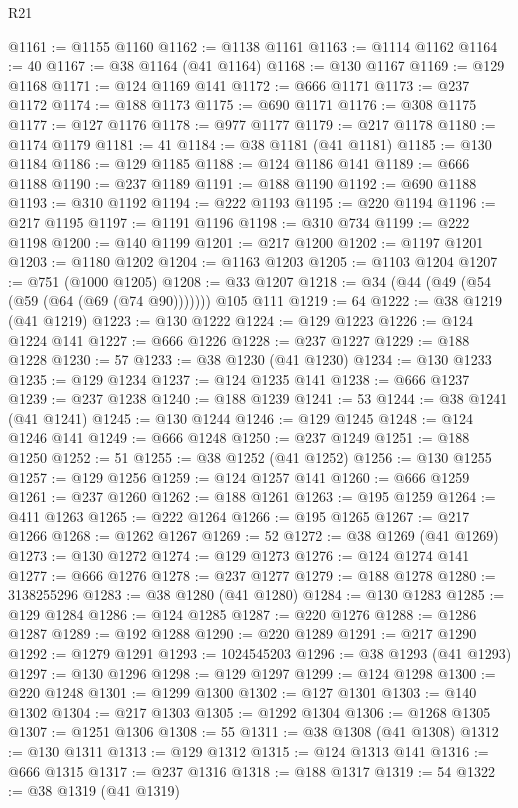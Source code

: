 \begin{lexlean}{R21}
\begin{coremodule}
@1161 := @1155 @1160
@1162 := @1138 @1161
@1163 := @1114 @1162
@1164 := 40
@1167 := @38 @1164 (@41 @1164)
@1168 := @130 @1167
@1169 := @129 @1168
@1171 := @124 @1169 @141
@1172 := @666 @1171
@1173 := @237 @1172
@1174 := @188 @1173
@1175 := @690 @1171
@1176 := @308 @1175
@1177 := @127 @1176
@1178 := @977 @1177
@1179 := @217 @1178
@1180 := @1174 @1179
@1181 := 41
@1184 := @38 @1181 (@41 @1181)
@1185 := @130 @1184
@1186 := @129 @1185
@1188 := @124 @1186 @141
@1189 := @666 @1188
@1190 := @237 @1189
@1191 := @188 @1190
@1192 := @690 @1188
@1193 := @310 @1192
@1194 := @222 @1193
@1195 := @220 @1194
@1196 := @217 @1195
@1197 := @1191 @1196
@1198 := @310 @734
@1199 := @222 @1198
@1200 := @140 @1199
@1201 := @217 @1200
@1202 := @1197 @1201
@1203 := @1180 @1202
@1204 := @1163 @1203
@1205 := @1103 @1204
@1207 := @751 (@1000 @1205)
@1208 := @33 @1207
@1218 := @34 (@44 (@49 (@54 (@59 (@64 (@69 (@74 @90))))))) @105 @111
@1219 := 64
@1222 := @38 @1219 (@41 @1219)
@1223 := @130 @1222
@1224 := @129 @1223
@1226 := @124 @1224 @141
@1227 := @666 @1226
@1228 := @237 @1227
@1229 := @188 @1228
@1230 := 57
@1233 := @38 @1230 (@41 @1230)
@1234 := @130 @1233
@1235 := @129 @1234
@1237 := @124 @1235 @141
@1238 := @666 @1237
@1239 := @237 @1238
@1240 := @188 @1239
@1241 := 53
@1244 := @38 @1241 (@41 @1241)
@1245 := @130 @1244
@1246 := @129 @1245
@1248 := @124 @1246 @141
@1249 := @666 @1248
@1250 := @237 @1249
@1251 := @188 @1250
@1252 := 51
@1255 := @38 @1252 (@41 @1252)
@1256 := @130 @1255
@1257 := @129 @1256
@1259 := @124 @1257 @141
@1260 := @666 @1259
@1261 := @237 @1260
@1262 := @188 @1261
@1263 := @195 @1259
@1264 := @411 @1263
@1265 := @222 @1264
@1266 := @195 @1265
@1267 := @217 @1266
@1268 := @1262 @1267
@1269 := 52
@1272 := @38 @1269 (@41 @1269)
@1273 := @130 @1272
@1274 := @129 @1273
@1276 := @124 @1274 @141
@1277 := @666 @1276
@1278 := @237 @1277
@1279 := @188 @1278
@1280 := 3138255296
@1283 := @38 @1280 (@41 @1280)
@1284 := @130 @1283
@1285 := @129 @1284
@1286 := @124 @1285
@1287 := @220 @1276
@1288 := @1286 @1287
@1289 := @192 @1288
@1290 := @220 @1289
@1291 := @217 @1290
@1292 := @1279 @1291
@1293 := 1024545203
@1296 := @38 @1293 (@41 @1293)
@1297 := @130 @1296
@1298 := @129 @1297
@1299 := @124 @1298
@1300 := @220 @1248
@1301 := @1299 @1300
@1302 := @127 @1301
@1303 := @140 @1302
@1304 := @217 @1303
@1305 := @1292 @1304
@1306 := @1268 @1305
@1307 := @1251 @1306
@1308 := 55
@1311 := @38 @1308 (@41 @1308)
@1312 := @130 @1311
@1313 := @129 @1312
@1315 := @124 @1313 @141
@1316 := @666 @1315
@1317 := @237 @1316
@1318 := @188 @1317
@1319 := 54
@1322 := @38 @1319 (@41 @1319)

\end{coremodule}
\end{lexlean}
